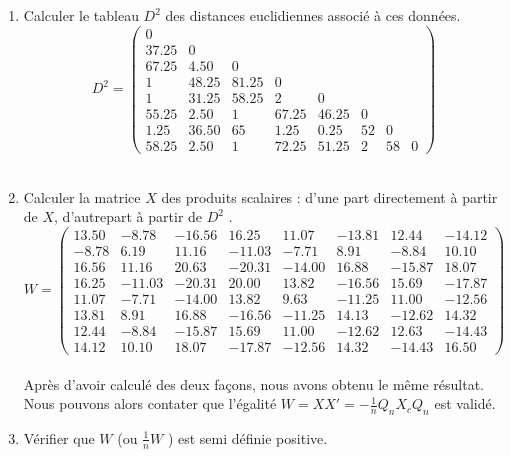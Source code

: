 \documentclass[a4paper,11pt]{article}
\begin{document}
\begin{enumerate}
  \item Calculer le tableau $D^2$ des distances euclidiennes associé à ces données.
    \[D^2 = \begin{pmatrix}
    0 \\
    37.25 & 0 \\
    67.25 & 4.50 & 0 \\
    1 & 48.25 & 81.25 & 0 \\
    1 & 31.25 & 58.25 & 2 & 0 \\
    55.25 & 2.50 & 1 & 67.25 & 46.25 & 0 \\
    1.25 & 36.50 & 65 & 1.25 & 0.25 & 52 & 0 \\
    58.25 & 2.50 & 1 & 72.25 & 51.25 & 2 & 58 & 0
    \end{pmatrix}\]
\\
  \item Calculer la matrice $X$ des produits scalaires : d’une part directement à partir de $X$, d’autrepart à partir de $D^2$ .
    \[W =\begin{pmatrix}
    13.50 & -8.78 & -16.56 & 16.25 & 11.07 & -13.81 & 12.44 & -14.12\\
    -8.78 &  6.19 & 11.16 & -11.03 & -7.71 &  8.91 & -8.84 & 10.10\\
    16.56 & 11.16 & 20.63 & -20.31 & -14.00 & 16.88 & -15.87 & 18.07\\
    16.25 & -11.03 & -20.31 & 20.00 & 13.82 & -16.56 & 15.69 & -17.87\\
    11.07 & -7.71 & -14.00 & 13.82 &  9.63 & -11.25 & 11.00 & -12.56\\
    13.81 &  8.91 & 16.88 & -16.56 & -11.25 & 14.13 & -12.62 & 14.32\\
    12.44 & -8.84 & -15.87 & 15.69 & 11.00 & -12.62 & 12.63 & -14.43\\
    14.12 & 10.10 & 18.07 & -17.87 & -12.56 & 14.32 & -14.43 & 16.50
    \end{pmatrix}\]\\
    Après d'avoir calculé des deux façons, nous avons obtenu le même résultat. Nous pouvons alors contater que l'égalité $W = XX'= -    \frac{1}{n}Q_{n}X_{c}Q_{n}$ est validé.
    \item Vérifier que $W$ (ou $\frac{1}{n}W$ ) est semi définie positive.
\end{enumerate}




\end{document}

